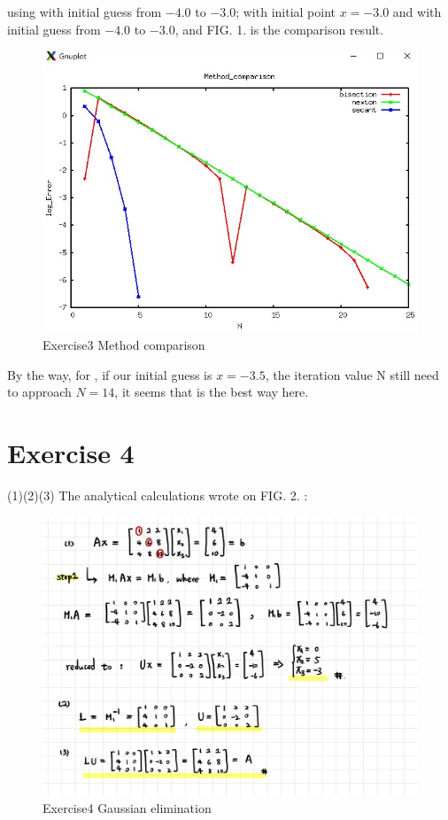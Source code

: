 \documentclass[aps,12pt,prd,nofootinbib,bibnotes, amsmath,amssymb,showpacs,superscriptaddress,floatfix]{revtex4-2}
\begin{document}
using {\color{blue}{(a) bisection method}} with initial guess from $-4.0$ to $-3.0$; {\color{blue}{(b) Newton-Raphson's method}} with initial point $x=-3.0$ and {\color{blue}{(c) secant method}} with initial guess from $-4.0$ to $-3.0$, and FIG. 1. is the comparison result.
\begin{figure}
	\centering
	\includegraphics[width=1.0\textwidth]{EX3_Method_comparison}
	\caption{Exercise3 Method comparison}
\end{figure}

By the way, for {\color{blue}{Newton-Raphson's method}}, if our initial guess is $x=-3.5$, the iteration value N still need to approach $N=14$, it seems that {\color{blue}{(c) secant method}} is the best way here.   
    
\section{Exercise 4}
(1)(2)(3) The analytical calculations wrote on FIG. 2. : 
\begin{figure}
	\centering
	\includegraphics[width=1.0\textwidth]{EX4}
	\caption{Exercise4 Gaussian elimination}
\end{figure}
\end{document}
